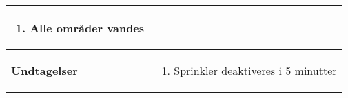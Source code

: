 \begin{center}
\begin{longtable}{|p{6cm}|p{8cm}|}
\begin{enumerate}
\begin{enumerate}
					\item Alle områder vandes					
					
				\end{enumerate}
	
			\end{enumerate}\\\hline

		\textbf{Undtagelser}
			&\begin{enumerate}[label=\ref{uc8sprinkler}a.]
			
				\item Sprinkler deaktiveres i 5 minutter		
			
			\end{enumerate}\\\hline
	\end{longtable}
	\label{UC8} 
\end{center}

